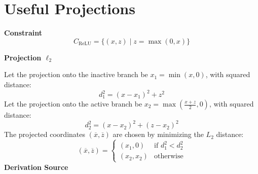 \documentclass{article}
\begin{document}
\section{Useful Projections}
\label{sec:projections}

\begin{tcolorbox}[projectioncard, title=ReLU Layer ($\ell_2$)]


\textbf{Constraint}
\[
C_{\mathrm{ReLU}} = \{(x, z) \mid z = \max(0, x)\}
\]

\textbf{Projection $\ell_2$}

Let the projection onto the inactive branch be $x_1 = \min(x, 0)$, with squared distance:
\[
d_1^2 = (x - x_1)^2 + z^2
\]
Let the projection onto the active branch be $x_2 = \max\left(\frac{x + z}{2}, 0\right)$, with squared distance:
\[
d_2^2 = (x - x_2)^2 + (z - x_2)^2
\]
The projected coordinates $(\overline{x}, \overline{z})$ are chosen by minimizing the $L_2$ distance:
\[
(\overline{x}, \overline{z}) = 
\begin{cases} 
(x_1, 0) & \text{if } d_1^2 < d_2^2 \\ 
(x_2, x_2) & \text{otherwise} 
\end{cases}
\]
\textbf{Derivation Source}
\cite{ elser2019learning}
\end{tcolorbox}
\end{document}
